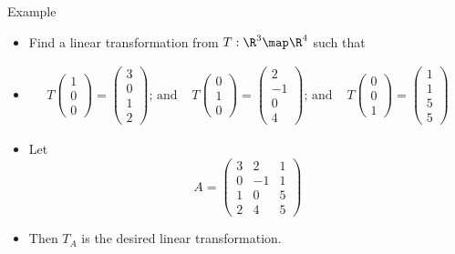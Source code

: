 \documentclass{beamer}
\begin{document}

\beamerdefaultoverlayspecification{<+->}

\begin{frame}{Example}
\begin{itemize}
\item Find a linear transformation from $T:\R^3\map\R^4$ such that
\item
$$
\begin{matrix}
T\begin{pmatrix} 1 \\ 0 \\ 0  \end{pmatrix} = \begin{pmatrix} 3 \\ 0 \\ 1 \\ 2  \end{pmatrix}
\text{; and }
&
T\begin{pmatrix} 0 \\ 1 \\ 0  \end{pmatrix} = \begin{pmatrix} 2 \\ -1 \\ 0 \\ 4  \end{pmatrix}
\text{; and }
&
T \begin{pmatrix} 0 \\ 0 \\ 1  \end{pmatrix} = \begin{pmatrix} 1 \\ 1 \\ 5 \\ 5  \end{pmatrix}
\end{matrix}
$$
\item Let
$$
A =
\begin{pmatrix}
3 & 2 & 1 \\
0 & -1 & 1 \\
1 & 0 & 5 \\
2 & 4 & 5
\end{pmatrix}
$$
\item Then $T_A$ is the desired linear transformation.
\end{itemize}
\end{frame}
\end{document}
